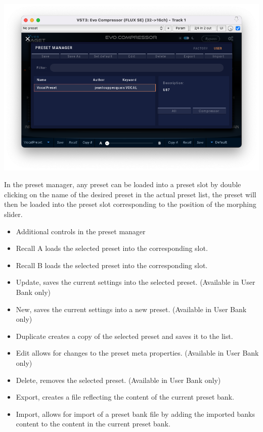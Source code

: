 \documentclass[
  letterpaper,
  DIV=11,
  numbers=noendperiod]{scrreport}
\providecommand{\tightlist}{%
  \setlength{\itemsep}{0pt}\setlength{\parskip}{0pt}}\usepackage{longtable,booktabs,array}
\begin{document}
\includegraphics{include/evoComp_userpreset.png}

In the preset manager, any preset can be loaded into a preset slot by
double clicking on the name of the desired preset in the actual preset
list, the preset will then be loaded into the preset slot corresponding
to the position of the morphing slider.

\begin{itemize}
\tightlist
\item
  Additional controls in the preset manager
\item
  Recall A loads the selected preset into the corresponding slot.
\item
  Recall B loads the selected preset into the corresponding slot.
\item
  Update, saves the current settings into the selected preset.
  (Available in User Bank only)
\item
  New, saves the current settings into a new preset. (Available in User
  Bank only)
\item
  Duplicate creates a copy of the selected preset and saves it to the
  list.
\item
  Edit allows for changes to the preset meta properties. (Available in
  User Bank only)
\item
  Delete, removes the selected preset. (Available in User Bank only)
\item
  Export, creates a file reflecting the content of the current preset
  bank.
\item
  Import, allows for import of a preset bank file by adding the imported
  banks content to the content in the current preset bank.
\end{itemize}
\end{document}
